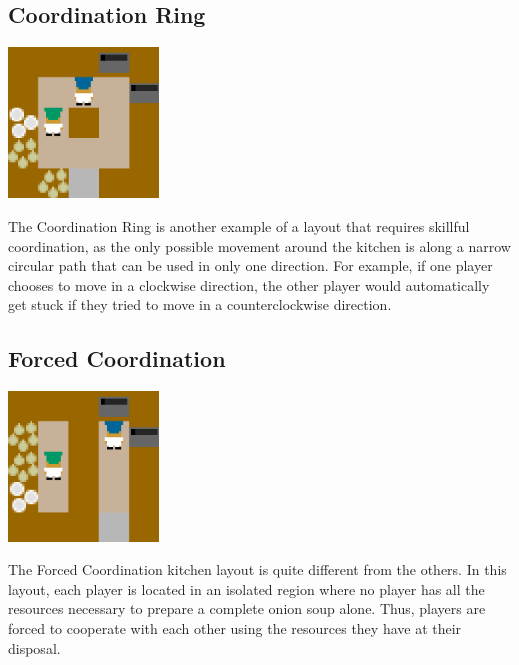 \subsection*{Coordination Ring}
\begin{center}
    \includegraphics*[width=4cm]{../img/coordination_ring_layout.png}
\end{center}
The Coordination Ring is another example of a layout that requires skillful coordination, as the only possible movement around the kitchen is along a narrow circular path that can be used in only one direction.
For example, if one player chooses to move in a clockwise direction, the other player would automatically get stuck if they tried to move in a counterclockwise direction.

\subsection*{Forced Coordination}
\begin{center}
    \includegraphics*[width=4cm]{../img/forced_coordination_layout.png}
\end{center}
The Forced Coordination kitchen layout is quite different from the others. 
In this layout, each player is located in an isolated region where no player has all the resources necessary to prepare a complete onion soup alone. 
Thus, players are forced to cooperate with each other using the resources they have at their disposal.

